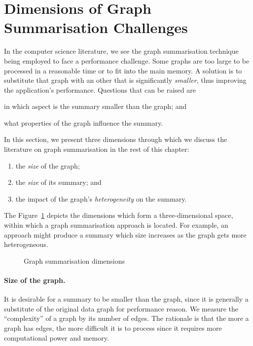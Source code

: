 \section{Dimensions of Graph Summarisation Challenges}

In the computer science literature, we see the graph summarisation technique being employed to face a performance challenge. Some graphs are too large to be processed in a reasonable time or to fit into the main memory. A solution is to substitute that graph with an other that is significantly \emph{smaller}, thus improving the application's performance. Questions that can be raised are
\begin{inparaenum}[(a)]
\item in which aspect is the summary smaller than the graph; and
\item what properties of the graph influence the summary.
\end{inparaenum}
In this section, we present three dimensions through which we discuss the literature on graph summarisation in the rest of this chapter:
\begin{enumerate}
\item the \emph{size} of the graph;
\item the \emph{size} of its summary; and
\item the impact of the graph's \emph{heterogeneity} on the summary.
\end{enumerate}
The Figure~\ref{fig:gs-axis} depicts the dimensions which form a three-dimensional space, within which a graph summarisation approach is located. For example, an approach might produce a summary which size increases as the graph gets more heterogeneous.

\begin{figure}
	\centering
	\resizebox{.5\textwidth}{!}{
		
	}
	\caption{Graph summarisation dimensions}
	\label{fig:gs-axis}
\end{figure}

\paragraph{Size of the graph.}

It is desirable for a summary to be smaller than the graph, since it is generally a substitute of the original data graph for performance reason. We measure the ``complexity'' of a graph by its number of edges. The rationale is that the more a graph has edges, the more difficult it is to process since it requires more computational power and memory.
%

